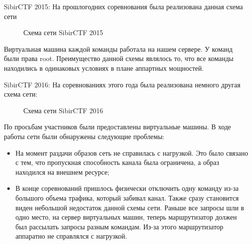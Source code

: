 SibirCTF 2015:
На прошлогодних соревнования была реализована данная схема сети
\begin{figure}[ht!]
\caption{Схема сети SibirCTF 2015}
\end{figure}
Виртуальная машина каждой команды работала на нашем сервере. У команд были права root. Преимущество данной схемы являлось то, что все команды находились в одинаковых условиях в плане аппартных мощностей.
\newpage

SibirCTF 2016:
На соревнованиях этого года была реализована немного другая схема сети:
\begin{figure}[ht!]
\caption{Схема сети SibirCTF 2016}
\end{figure}

По просьбам участников были предоставлены виртуальные машины. В ходе работы сети были обнаружены следующие проблемы:
\begin{itemize}
\item На момент раздачи образов сеть не справилась с нагрузкой. Это было связано с тем, что пропускная способность канала была ограничена, а образ находился на внешнем ресурсе;
\item В конце соревнований пришлось физически отключить одну команду из-за большого объема трафика, который забивал канал. Также сразу становится виден небольшой недостаток данной схемы сети. Раньше все запросы шли в одно место, на сервер виртуальных машин, теперь маршрутизатор должен был рассылать запросы разным командам. Из-за этого маршрутизатор аппаратно не справлялся с нагрузкой.
\end{itemize}

